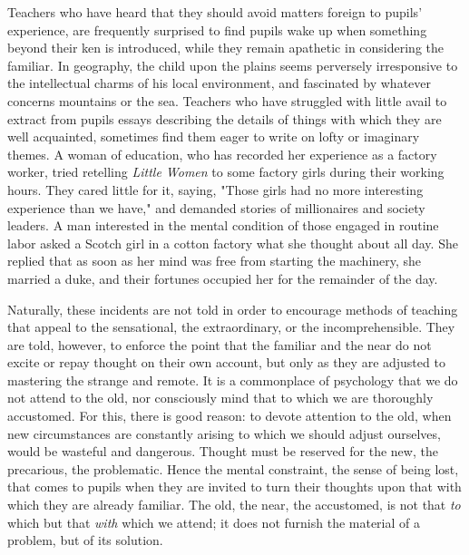 \documentclass[letterpaper]{book}
\begin{document}

Teachers who have heard that they should avoid matters foreign to
pupils' experience, are frequently surprised to find pupils wake up when
something beyond their ken is introduced, while they remain apathetic in
considering the familiar. In geography, the child upon the plains seems
perversely irresponsive to the intellectual charms of his local
environment, and fascinated by whatever concerns mountains or the sea.
Teachers who have struggled with little avail to extract from pupils
essays describing the details of things with which they are well
acquainted, sometimes find them eager to write on lofty or imaginary
themes. A woman of education, who has recorded her experience as a
factory worker, tried retelling \emph{Little Women} to some factory
girls during their working hours. They cared little for it, saying,
"Those girls had no more interesting experience than we have," and
demanded stories of millionaires and society leaders. A man interested
in the mental condition of those engaged in routine labor asked a Scotch
girl in a cotton factory what she thought about all day. She replied
that as soon as her mind was free from starting the machinery, she
married a duke, and their fortunes occupied her for the remainder of the
day.


Naturally, these incidents are not told in order to encourage methods of
teaching that appeal to the
sensational,
the extraordinary, or the incomprehensible. They are told, however, to
enforce the point that the familiar and the near do not excite or repay
thought on their own account, but only as they are adjusted to mastering
the strange and remote. It is a commonplace of psychology that we do not
attend to the old, nor consciously mind that to which we are thoroughly
accustomed. For this, there is good reason: to devote attention to the
old, when new circumstances are constantly arising to which we should
adjust ourselves, would be wasteful and dangerous. Thought must be
reserved for the new, the precarious, the problematic. Hence the mental
constraint, the sense of being lost, that comes to pupils when they are
invited to turn their thoughts upon that with which they are already
familiar. The old, the near, the accustomed, is not that \emph{to} which
but that \emph{with} which we attend; it does not furnish the material
of a problem, but of its solution.

\end{document}
